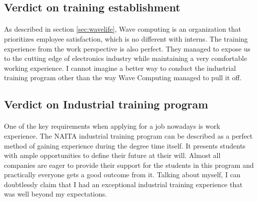 \subsection{Verdict on training establishment}
\paragraph{}
As described in section \ref{sec:wavelife}, Wave computing is an organization that prioritizes employee satisfaction, which is no different with interns. The training experience from the work perspective is also perfect. They managed to expose us to the cutting edge of electronics industry while maintaining a very comfortable working experience. I cannot imagine a better way to conduct the industrial training program other than the way Wave Computing managed to pull it off.

\subsection{Verdict on Industrial training program}
\paragraph{}
One of the key requirements when applying for a job nowadays is work experience. The NAITA industrial training program can be described as a perfect method of gaining experience during the degree time itself. It presents students with ample opportunities to define their future at their will. Almost all companies are eager to provide their support for the students in this program and practically everyone gets a good outcome from it. Talking about myself, I can doubtlessly claim that I had an exceptional industrial training experience that was well beyond my expectations.